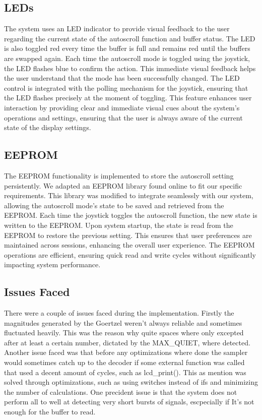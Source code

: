 \documentclass{cce2014-design}
\begin{document}
\subsection{LEDs}
The system uses an LED indicator to provide visual feedback to the user 
regarding the current state of the autoscroll function and buffer status. The LED 
is also toggled red every time the buffer is full and remains red until the 
buffers are swapped again. Each time the autoscroll mode is toggled using the 
joystick, the LED flashes blue to confirm the action. This immediate visual 
feedback helps the user understand that the mode has been successfully changed. 
The LED control is integrated with the polling mechanism for the joystick, 
ensuring that the LED flashes precisely at the moment of toggling. This feature 
enhances user interaction by providing clear and immediate visual cues 
about the system's operations and settings, ensuring that the user is always 
aware of the current state of the display settings.

\subsection{EEPROM}
The EEPROM functionality is implemented to store the autoscroll setting persistently. 
We adapted an EEPROM library found online \cite{nxp-cdl} to fit our specific 
requirements. This library was modified to integrate seamlessly with our system, 
allowing the autoscroll mode's state to be saved and retrieved from the EEPROM. 
Each time the joystick toggles the autoscroll function, the new state is written 
to the EEPROM. Upon system startup, the state is read from the EEPROM to restore 
the previous setting. This ensures that user preferences are maintained across
sessions, enhancing the overall user experience. The EEPROM operations are 
efficient, ensuring quick read and write cycles without significantly impacting 
system performance.

\subsection{Issues Faced}
There were a couple of issues faced during the implementation. Firstly the magnitudes
generated by the Goertzel weren't always reliable and sometimes fluctuated heavily.
This was the reason why quite spaces where only excepted after at least a certain 
number, dictated by the MAX\_QUIET, where detected. Another issue faced was that
before any optimizations where done the sampler would sometimes catch up to the decoder
if some external function was called that used a decent amount of cycles, such as 
lcd\_print(). This as mention was solved through optimizations, such as using switches
instead of ifs and minimizing the number of calculations. One precident issue is that 
the system does not perform all to well at detecting very short bursts of signals,
escpecially if It's not enough for the buffer to read.
\end{document}
